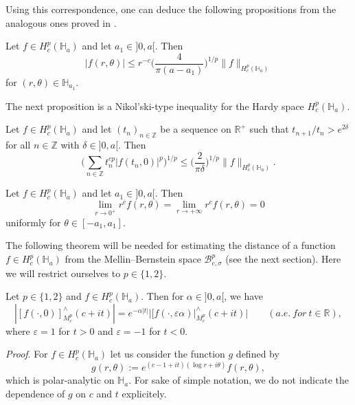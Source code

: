 \documentclass[amsmath,english,a4paper,graphicx,12pt]{article}
\begin{document}
Using this correspondence, one can deduce the following propositions from the analogous ones proved in \cite{BSS2}. 
\begin{Proposition}\label{p1}
Let $f \in H^p_c(\mathbb{H}_a)$ and let $a_1 \in {]}0,a{[}.$ Then
$$|f(r,\theta)| \leq r^{-c}\bigg(\frac{4}{\pi(a-a_1)}\bigg)^{1/p}\|f\|_{H^p_c(\mathbb{H}_a)}$$
for $(r,\theta) \in \mathbb{H}_{a_1}.$
\end{Proposition}
The next proposition is a Nikol'ski-type inequality for the Hardy space $H^p_c(\mathbb{H}_a).$
\begin{Proposition}\label{p2}
Let $f \in H^p_c(\mathbb{H}_a)$ and let $(t_n)_{n \in \mathbb{Z}}$ be a sequence on $\mathbb{R}^+$ such that $t_{n+1}/t_n > e^{2\delta}$ for all 
$n \in \mathbb{Z}$ with 
$\delta \in {]}0,a{[}.$ Then
$$\bigg(\sum_{n \in \mathbb{Z}} t_n^{cp}|f(t_n,0)|^p\bigg)^{1/p} \leq \bigg(\frac{2}{\pi \delta}\bigg)^{1/p} \|f\|_{H^p_c(\mathbb{H}_a)}.$$
\end{Proposition}
\begin{Proposition}\label{p3}
Let $f \in H^p_c(\mathbb{H}_a)$ and let $a_1 \in {]}0,a{[}.$ Then
$$\lim_{r \rightarrow 0^+}r^cf(r,\theta) =\lim_{r \rightarrow +\infty}r^cf(r,\theta) =0$$
uniformly for $\theta \in [-a_1, a_1].$
\end{Proposition}
The following theorem will be needed for estimating the distance of a function $f\in H^p_c(\mathbb{H}_a)$ from the Mellin--Bernstein space 
$\mathscr{B}^p_{c,\sigma}$ (see the next section). Here we will restrict ourselves to $p\in \{1,2\}.$
\begin{Theorem}\label{mellintransf}
Let $p \in \{1,2\}$ and $f\in H^p_c(\mathbb{H}_a).$ Then for $\alpha \in {]}0,a{[}$, we have
$$|[f(\cdot,0)]^\wedge_{M^p_c}(c+it)| = e^{-\alpha |t|}|[f(\cdot, \varepsilon \alpha)|^\wedge_{M^p_c}(c+it)| \qquad (a.e.~ for~ t \in \mathbb{R}),$$
where $\varepsilon = 1$ for $t>0$ and $\varepsilon = -1$ for $t<0.$
\end{Theorem}
{\it Proof}. For $f \in H^p_c(\mathbb{H}_a)$ let us consider the function $g$ defined by
$$g(r,\theta):= e^{(c-1+it)(\log r + i\theta)}f(r, \theta),$$
which is polar-analytic on $\mathbb{H}_a.$ For  sake of simple notation, we do not indicate  the dependence of $g$ on $c$ and $t$ explicitely.
\end{document}
